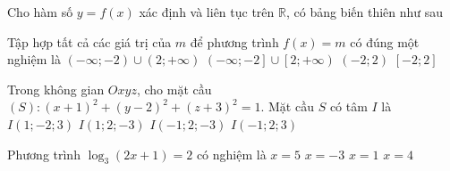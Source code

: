 \begin{ex}%
Cho hàm số $y=f(x)$ xác định và liên tục trên $\mathbb{R}$,  có bảng biến thiên như sau
\begin{center}
\end{center}
Tập hợp tất cả các giá trị của $m$ để phương trình $f(x)=m$ có đúng một nghiệm là
\choice
{\True $\left(-\infty;-2\right)\cup \left(2;+\infty \right)$}
{$\left(-\infty;-2\right]\cup \left[2;+\infty \right)$}
{$\left(-2;2\right)$}
{$\left[-2;2\right]$}
\end{ex}

\begin{ex}%
Trong không gian $Oxyz$, cho mặt cầu $(S):{\left(x+1\right)}^2+{\left(y-2\right)}^2+{\left(z+3\right)}^2=1$. Mặt cầu $S$ có tâm $I$ là
\choice
{$I\left(1;-2;3\right)$}
{$I\left(1;2;-3\right)$}
{\True $I\left(-1;2;-3\right)$}
{$I\left(-1;2;3\right)$}
\end{ex}

\begin{ex}%
Phương trình $\log_3(2x+1)=2$ có nghiệm là
\choice
{$x=5$}
{$x=-3$}
{$x=1$}
{\True $x=4$}
\end{ex}

